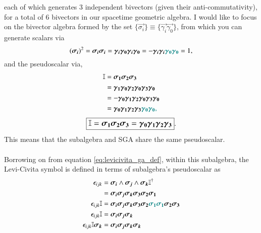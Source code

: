 each of which generates 3 independent bivectors (given their anti-commutativity), for a total of 6 bivectors in our spacetime geom{etric algebra. I would like to focus on the bivector algebra formed by the set $ \{ \vec{\sigma_i} \} \equiv \{\vec{\gamma_i}\vec{\gamma_0}\}$, from which you can generate scalars via
\begin{equation} \label{eq:pauli_unitary}
    (\vec{\sigma_i})^2 = \vec{\sigma_i} \vec{\sigma_i}  =  \vec{\gamma_i} \vec{\gamma_0} \vec{\gamma_i} \vec{\gamma_0} = - \vec{\gamma_i} \vec{\gamma_i}  \color{teal} \vec{\gamma_0} \vec{\gamma_0} \color{black} = 1,
\end{equation}
and the pseudoscalar via,
\begin{align*}
    \mathbb{I} &=  \vec{\sigma_1} \vec{\sigma_2} \vec{\sigma_3} \\
    &= \vec{\gamma_1} \vec{\gamma_0} \vec{\gamma_2} \vec{\gamma_0} \vec{\gamma_3} \vec{\gamma_0} \\
    &=-\vec{\gamma_0} \vec{\gamma_1} \vec{\gamma_2} \vec{\gamma_0} \vec{\gamma_3} \vec{\gamma_0} \\
    &= \vec{\gamma_0} \vec{\gamma_1} \vec{\gamma_2} \vec{\gamma_3} \color{teal}\vec{\gamma_0} \vec{\gamma_0},
\end{align*}
\begin{equation}
    \large \boxed{ \mathbb{I} =  \vec{\sigma_1} \vec{\sigma_2} \vec{\sigma_3}=\vec{\gamma_0} \vec{\gamma_1} \vec{\gamma_2} \vec{\gamma_3}   }.
\end{equation}
This means that the subalgebra and SGA share the same pseudoscalar.
\\ \\ 
Borrowing on from equation \eqref{eq:levicivita_ga_def}, within this subalgebra, the Levi-Civita symbol is defined in terms of subalgebra's pseudoscalar as
\begin{align*}
    \epsilon_{ijk} &=  \vec{\sigma_i} \wedge \vec{\sigma_j} \wedge \vec{\sigma_k} \mathbb{I}^\dagger \\
                    &= \vec{\sigma_i} \vec{\sigma_j} \vec{\sigma_k} \vec{\sigma_3} \vec{\sigma_2} \vec{\sigma_1} \\
    \epsilon_{ijk} \mathbb{I} &= \vec{\sigma_i} \vec{\sigma_j} \vec{\sigma_k} \vec{\sigma_3}\vec{\sigma_2} \color{teal} \vec{\sigma_1} \vec{\sigma_1} \color{black} \vec{\sigma_2} \vec{\sigma_3} \\
    \epsilon_{ijk} \mathbb{I} &= \vec{\sigma_i} \vec{\sigma_j} \vec{\sigma_k} \\
    \epsilon_{ijk} \mathbb{I} \vec{\sigma_k} &= \vec{\sigma_i} \vec{\sigma_j} \vec{\sigma_k}  \vec{\sigma_k} 

\end{align*}}
